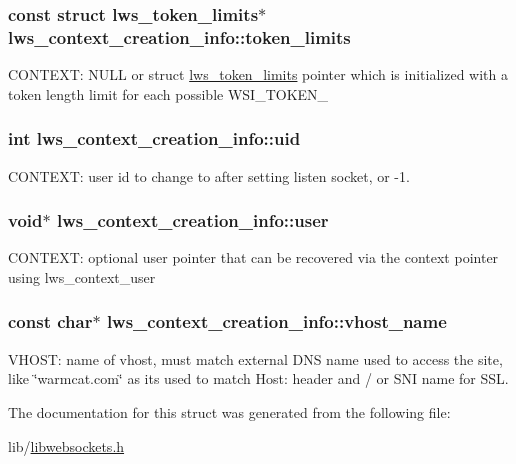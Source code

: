 \subsubsection[{\texorpdfstring{token\+\_\+limits}{token\_limits}}]{\setlength{\rightskip}{0pt plus 5cm}const struct {\bf lws\+\_\+token\+\_\+limits}$\ast$ lws\+\_\+context\+\_\+creation\+\_\+info\+::token\+\_\+limits}\hypertarget{structlws__context__creation__info_ac8a75b7b259a3c3a5fbb4219a3f06c29}{}\label{structlws__context__creation__info_ac8a75b7b259a3c3a5fbb4219a3f06c29}
C\+O\+N\+T\+E\+XT\+: N\+U\+LL or struct \hyperlink{structlws__token__limits}{lws\+\_\+token\+\_\+limits} pointer which is initialized with a token length limit for each possible W\+S\+I\+\_\+\+T\+O\+K\+E\+N\+\_\+ 
\subsubsection[{\texorpdfstring{uid}{uid}}]{\setlength{\rightskip}{0pt plus 5cm}int lws\+\_\+context\+\_\+creation\+\_\+info\+::uid}\hypertarget{structlws__context__creation__info_ac105b4180008cb3e672d57beead8382e}{}\label{structlws__context__creation__info_ac105b4180008cb3e672d57beead8382e}
C\+O\+N\+T\+E\+XT\+: user id to change to after setting listen socket, or -\/1. 
\subsubsection[{\texorpdfstring{user}{user}}]{\setlength{\rightskip}{0pt plus 5cm}void$\ast$ lws\+\_\+context\+\_\+creation\+\_\+info\+::user}\hypertarget{structlws__context__creation__info_a0e9d94cdfb893d777b4a4db81e7b5ac0}{}\label{structlws__context__creation__info_a0e9d94cdfb893d777b4a4db81e7b5ac0}
C\+O\+N\+T\+E\+XT\+: optional user pointer that can be recovered via the context pointer using lws\+\_\+context\+\_\+user 
\subsubsection[{\texorpdfstring{vhost\+\_\+name}{vhost\_name}}]{\setlength{\rightskip}{0pt plus 5cm}const char$\ast$ lws\+\_\+context\+\_\+creation\+\_\+info\+::vhost\+\_\+name}\hypertarget{structlws__context__creation__info_ad50db098a208f045f7811207d2bee4b9}{}\label{structlws__context__creation__info_ad50db098a208f045f7811207d2bee4b9}
V\+H\+O\+ST\+: name of vhost, must match external D\+NS name used to access the site, like \char`\"{}warmcat.\+com\char`\"{} as it\textquotesingle{}s used to match Host\+: header and / or S\+NI name for S\+SL. 

The documentation for this struct was generated from the following file\+:\begin{DoxyCompactItemize}
\item 
lib/\hyperlink{libwebsockets_8h}{libwebsockets.\+h}\end{DoxyCompactItemize}
